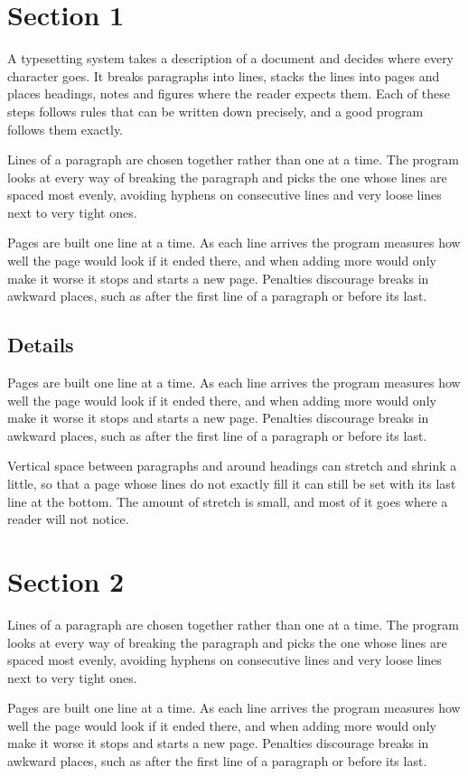 \documentclass{article}
\begin{document}
\section{Section 1}
A typesetting system takes a description of a document and decides where every character goes. It breaks paragraphs into lines, stacks the lines into pages and places headings, notes and figures where the reader expects them. Each of these steps follows rules that can be written down precisely, and a good program follows them exactly.

Lines of a paragraph are chosen together rather than one at a time. The program looks at every way of breaking the paragraph and picks the one whose lines are spaced most evenly, avoiding hyphens on consecutive lines and very loose lines next to very tight ones.

Pages are built one line at a time. As each line arrives the program measures how well the page would look if it ended there, and when adding more would only make it worse it stops and starts a new page. Penalties discourage breaks in awkward places, such as after the first line of a paragraph or before its last.
\subsection{Details}
Pages are built one line at a time. As each line arrives the program measures how well the page would look if it ended there, and when adding more would only make it worse it stops and starts a new page. Penalties discourage breaks in awkward places, such as after the first line of a paragraph or before its last.

Vertical space between paragraphs and around headings can stretch and shrink a little, so that a page whose lines do not exactly fill it can still be set with its last line at the bottom. The amount of stretch is small, and most of it goes where a reader will not notice.
\section{Section 2}
Lines of a paragraph are chosen together rather than one at a time. The program looks at every way of breaking the paragraph and picks the one whose lines are spaced most evenly, avoiding hyphens on consecutive lines and very loose lines next to very tight ones.

Pages are built one line at a time. As each line arrives the program measures how well the page would look if it ended there, and when adding more would only make it worse it stops and starts a new page. Penalties discourage breaks in awkward places, such as after the first line of a paragraph or before its last.
\end{document}
